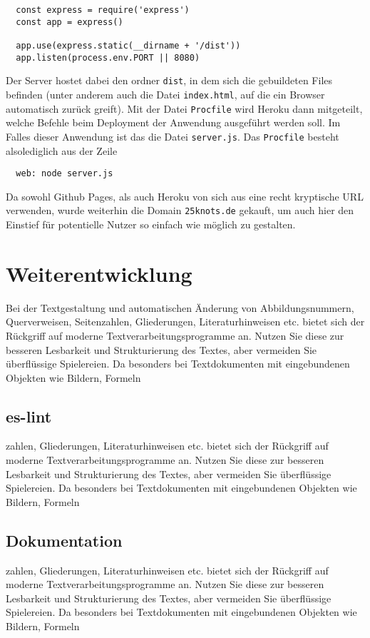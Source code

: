 \begin{lstlisting}
  const express = require('express')
  const app = express()

  app.use(express.static(__dirname + '/dist'))
  app.listen(process.env.PORT || 8080)
\end{lstlisting}

Der Server hostet dabei den ordner \verb|dist|, in dem sich die gebuildeten Files befinden (unter anderem auch die Datei \verb|index.html|, auf die ein Browser automatisch zurück greift). Mit der Datei \verb|Procfile| wird Heroku dann mitgeteilt, welche Befehle beim Deployment der Anwendung ausgeführt werden soll. Im Falles dieser Anwendung ist das die Datei \verb|server.js|. Das \verb|Procfile| besteht alsolediglich aus der Zeile

\begin{lstlisting}
  web: node server.js
\end{lstlisting}

Da sowohl Github Pages, als auch Heroku von sich aus eine recht kryptische URL verwenden, wurde weiterhin die Domain \verb|25knots.de| gekauft, um auch hier den Einstief für potentielle Nutzer so einfach wie möglich zu gestalten.



\section{Weiterentwicklung}
Bei der Textgestaltung und automatischen Änderung von Abbildungsnummern, Querverweisen,
Seitenzahlen, Gliederungen, Literaturhinweisen etc. bietet sich der Rückgriff
auf moderne Textverarbeitungsprogramme an. Nutzen Sie diese zur besseren Lesbarkeit
und Strukturierung des Textes, aber vermeiden Sie überflüssige Spielereien. Da
besonders bei Textdokumenten mit eingebundenen Objekten wie Bildern, Formeln

\subsection{es-lint}
zahlen, Gliederungen, Literaturhinweisen etc. bietet sich der Rückgriff
auf moderne Textverarbeitungsprogramme an. Nutzen Sie diese zur besseren Lesbarkeit
und Strukturierung des Textes, aber vermeiden Sie überflüssige Spielereien. Da
besonders bei Textdokumenten mit eingebundenen Objekten wie Bildern, Formeln

\subsection{Dokumentation}
zahlen, Gliederungen, Literaturhinweisen etc. bietet sich der Rückgriff
auf moderne Textverarbeitungsprogramme an. Nutzen Sie diese zur besseren Lesbarkeit
und Strukturierung des Textes, aber vermeiden Sie überflüssige Spielereien. Da
besonders bei Textdokumenten mit eingebundenen Objekten wie Bildern, Formeln

